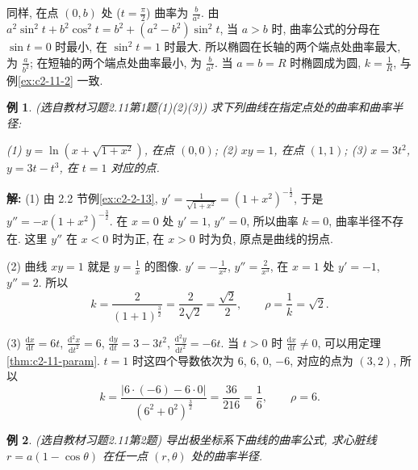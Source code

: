 \documentclass[UTF8,openany]{ctexbook}
\theoremstyle{chinesetextbook}
\newtheorem{example}{例}[section]
\newenvironment{cnsolution}{\par\indent\textbf{解:} \ignorespaces}{\par}
\newcommand{\dd}{\mathrm d}
\begin{document}
同样, 在点 $(0,b)$ 处 ($\displaystyle t=\frac\pi2$) 曲率为 $\displaystyle\frac b{a^2}$. 由 $a^2\sin^2t+b^2\cos^2t=b^2+(a^2-b^2)\sin^2t$, 当 $a>b$ 时, 曲率公式的分母在 $\sin t=0$ 时最小, 在 $\sin^2t=1$ 时最大. 所以椭圆在长轴的两个端点处曲率最大, 为 $\displaystyle\frac a{b^2}$; 在短轴的两个端点处曲率最小, 为 $\displaystyle\frac b{a^2}$. 当 $a=b=R$ 时椭圆成为圆, $\displaystyle k=\frac1R$, 与例\ref{ex:c2-11-2} 一致.
\begin{example}\label{ex:c2-h11-1}
\textnormal{(选自教材习题2.11第1题(1)(2)(3))} 求下列曲线在指定点处的曲率和曲率半径:

(1) $y=\ln\left(x+\sqrt{1+x^2}\right)$, 在点 $(0,0)$; (2) $xy=1$, 在点 $(1,1)$; (3) $x=3t^2$, $y=3t-t^3$, 在 $t=1$ 对应的点.
\end{example}
\begin{cnsolution}
(1) 由 2.2 节例\ref{ex:c2-2-13}, $\displaystyle y'=\frac1{\sqrt{1+x^2}}=(1+x^2)^{-\frac12}$, 于是 $y''=-x(1+x^2)^{-\frac32}$. 在 $x=0$ 处 $y'=1$, $y''=0$, 所以曲率 $k=0$, 曲率半径不存在. 这里 $y''$ 在 $x<0$ 时为正, 在 $x>0$ 时为负, 原点是曲线的拐点.

(2) 曲线 $xy=1$ 就是 $\displaystyle y=\frac1x$ 的图像. $\displaystyle y'=-\frac1{x^2}$, $\displaystyle y''=\frac2{x^3}$, 在 $x=1$ 处 $y'=-1$, $y''=2$. 所以
\[
k=\frac2{(1+1)^{\frac32}}=\frac2{2\sqrt2}=\frac{\sqrt2}2,\qquad\rho=\frac1k=\sqrt2.
\]

(3) $\displaystyle\frac{\dd x}{\dd t}=6t$, $\displaystyle\frac{\dd^2x}{\dd t^2}=6$, $\displaystyle\frac{\dd y}{\dd t}=3-3t^2$, $\displaystyle\frac{\dd^2y}{\dd t^2}=-6t$. 当 $t>0$ 时 $\displaystyle\frac{\dd x}{\dd t}\ne0$, 可以用定理\ref{thm:c2-11-param}. $t=1$ 时这四个导数依次为 $6$, $6$, $0$, $-6$, 对应的点为 $(3,2)$, 所以
\[
k=\frac{|6\cdot(-6)-6\cdot0|}{(6^2+0^2)^{\frac32}}=\frac{36}{216}=\frac16,\qquad\rho=6.
\]
\end{cnsolution}
\begin{example}\label{ex:c2-h11-2}
\textnormal{(选自教材习题2.11第2题)} 导出极坐标系下曲线的曲率公式, 求心脏线 $r=a(1-\cos\theta)$ 在任一点 $(r,\theta)$ 处的曲率半径.
\end{example}
\end{document}
